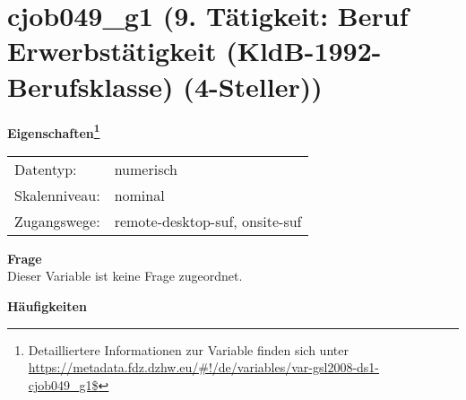 
    \setcounter{footnote}{0}

    \vspace*{-1.8cm}
	\section{cjob049\_g1 (9. Tätigkeit: Beruf Erwerbstätigkeit (KldB-1992-Berufsklasse) (4-Steller))}
	\label{section:cjob049_g1}



    \vspace*{0.5cm}
    \noindent\textbf{Eigenschaften\footnote{Detailliertere Informationen zur Variable finden sich unter
		\url{https://metadata.fdz.dzhw.eu/\#!/de/variables/var-gsl2008-ds1-cjob049_g1$}}}\\
	\begin{tabularx}{\hsize}{@{}lX}
	Datentyp: & numerisch \\
	Skalenniveau: & nominal \\
	Zugangswege: &
	  remote-desktop-suf, 
	  onsite-suf
 \\
    \end{tabularx}



		\vspace*{0.5cm}
		\noindent\textbf{Frage}\\
		Dieser Variable ist keine Frage zugeordnet.





        		\vspace*{0.5cm}
                \noindent\textbf{Häufigkeiten}

